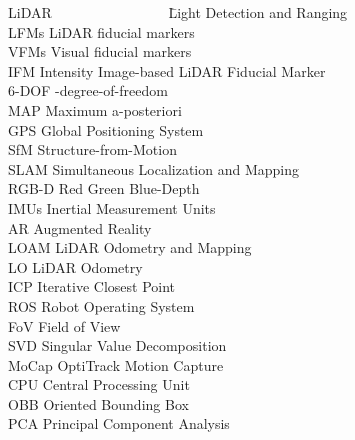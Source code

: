 \begin{tabbing}

LiDAR ~~~~~~~~~~~~~~~~\= Light Detection and Ranging\\

LFMs \> LiDAR fiducial markers\\

VFMs \> Visual fiducial markers\\

IFM \> Intensity Image-based LiDAR Fiducial Marker\\

6-DOF -degree-of-freedom\\

MAP \> Maximum a-posteriori\\

GPS \> Global Positioning System\\

SfM \> Structure-from-Motion\\

SLAM \> Simultaneous Localization and Mapping\\

RGB-D \> Red Green Blue-Depth\\

IMUs \> Inertial Measurement Units\\

AR \> Augmented Reality\\

LOAM \> LiDAR Odometry and Mapping\\

LO \> LiDAR Odometry\\

ICP \> Iterative Closest Point\\


ROS \> Robot Operating System\\

FoV \> Field of View\\

SVD \> Singular Value Decomposition\\

MoCap \> OptiTrack Motion Capture\\

CPU \> Central Processing Unit\\

OBB \> Oriented Bounding Box\\

PCA \> Principal Component Analysis\\
 

\end{tabbing}
